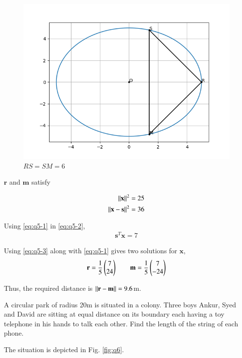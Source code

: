 \documentclass[journal,12pt,twocolumn]{IEEEtran}
\let\vec\mathbf
\begin{document}
\begin{figure}[!ht]
    \centering
    \includegraphics[width=\columnwidth]{figs/10_4_5.png}
    \caption{$RS = SM = 6$}
    \label{fig:q5}
\end{figure}
$\vec{r}$ and $\vec{m}$ satisfy

\begin{align}
    \norm{\vec{x}}^2 &= 25 \label{eq:q5-1} \\
    \norm{\vec{x} - \vec{s}}^2 &= 36 \label{eq:q5-2}
\end{align}

Using \eqref{eq:q5-1} in \eqref{eq:q5-2},
\begin{align}
    \vec{s}^T\vec{x} = 7 
    \label{eq:q5-3}
\end{align}

Using \eqref{eq:q5-3} along with \eqref{eq:q5-1} gives two solutions for $\vec{x}$,
\begin{align}
    \vec{r} = \frac{1}{5}\myvec{7\\24} \qquad \vec{m} = \frac{1}{5}\myvec{7\\-24}
    \label{eq:q5-4}
\end{align}

Thus, the required distance is $\norm{\vec{r} - \vec{m}} = 9.6$m.

\problem A circular park of radius 20m is situated in a colony. Three boys Ankur,
Syed and David are sitting at equal distance on its boundary each having a toy 
telephone in his hands to talk each other. Find the length of the string of each 
phone.

\solution The situation is depicted in Fig. \eqref{fig:q6}.
\end{document}
